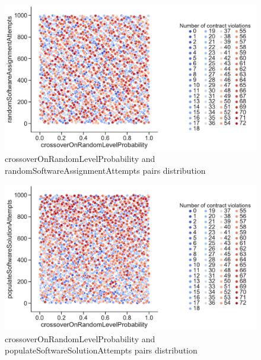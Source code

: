 \begin{figure}
	\centering
	\includegraphics[width=\textwidth]{images/PairsDistr/crossoverOnRandomLevelProbability_randomSoftwareAssignmentAttempts.pdf}
	\caption[crossoverOnRandomLevelProbability and randomSoftwareAssignmentAttempts pairs distribution]{crossoverOnRandomLevelProbability and randomSoftwareAssignmentAttempts pairs distribution}
	\label{fig:crossoverOnRandomLevelProbability_randomSoftwareAssignmentAttempts_pair}
\end{figure}
\clearpage
\begin{figure}
	\centering
	\includegraphics[width=\textwidth]{images/PairsDistr/crossoverOnRandomLevelProbability_populateSoftwareSolutionAttempts.pdf}
	\caption[crossoverOnRandomLevelProbability and populateSoftwareSolutionAttempts pairs distribution]{crossoverOnRandomLevelProbability and populateSoftwareSolutionAttempts pairs distribution}
	\label{fig:crossoverOnRandomLevelProbability_populateSoftwareSolutionAttempts_pair}
\end{figure}
\clearpage
